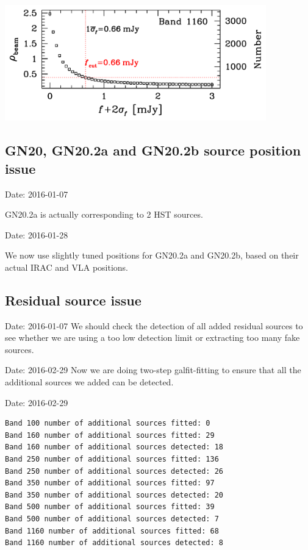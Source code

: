 \documentclass[11pt,a4paper]{article}
\begin{document}
\begin{center}
	\includegraphics[width=0.85\textwidth]{plot_cutting_flux_1160} \\
\end{center}



\subsection{GN20, GN20.2a and GN20.2b source position issue}

\textcolor{green!90!black!60!orange}{Date: 2016-01-07}

GN20.2a is actually corresponding to 2 HST sources. 

\textcolor{green!90!black!60!orange}{Date: 2016-01-28}

We now use slightly tuned positions for GN20.2a and GN20.2b, based on their actual IRAC and VLA positions. 



\subsection{Residual source issue}

\textcolor{green!90!black!60!orange}{Date: 2016-01-07}
We should check the detection of all added residual sources to see whether we are using a too low detection limit or extracting too many fake sources. 

\textcolor{green!90!black!60!orange}{Date: 2016-02-29}
Now we are doing two-step galfit-fitting to ensure that all the additional sources we added can be detected. 

\textcolor{green!90!black!60!orange}{Date: 2016-02-29}
\begin{lstlisting}[language=bash]
Band 100 number of additional sources fitted: 0
Band 160 number of additional sources fitted: 29
Band 160 number of additional sources detected: 18
Band 250 number of additional sources fitted: 136
Band 250 number of additional sources detected: 26
Band 350 number of additional sources fitted: 97
Band 350 number of additional sources detected: 20
Band 500 number of additional sources fitted: 39
Band 500 number of additional sources detected: 7
Band 1160 number of additional sources fitted: 68
Band 1160 number of additional sources detected: 8
\end{lstlisting}
\end{document}
